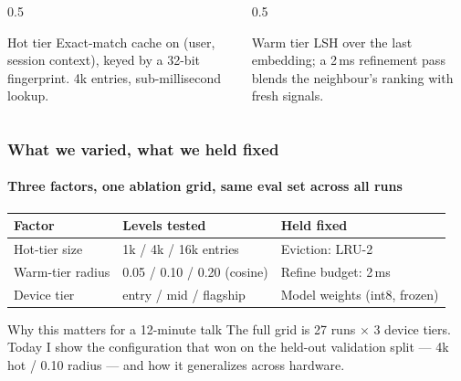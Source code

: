 \begin{frame}
\begin{center}
  \end{center}
  \vspace{1mm}
  \small
  \begin{columns}[T]
    \begin{column}{0.5\textwidth}
      \begin{block}{Hot tier}
        Exact-match cache on (user, session context), keyed by a 32-bit fingerprint. 4k entries, sub-millisecond lookup.
      \end{block}
    \end{column}
    \begin{column}{0.5\textwidth}
      \begin{block}{Warm tier}
        LSH over the last embedding; a 2\,ms refinement pass blends the neighbour's ranking with fresh signals.
      \end{block}
    \end{column}
  \end{columns}
\end{frame}

\begin{frame}
  \frametitle{What we varied, what we held fixed}
  \framesubtitle{Three factors, one ablation grid, same eval set across all runs}
  \begin{table}
    \centering
    \small
    \begin{tabular}{@{}lll@{}}
      \toprule
      \textbf{Factor} & \textbf{Levels tested} & \textbf{Held fixed} \\
      \midrule
      Hot-tier size & 1k / 4k / 16k entries & Eviction: LRU-2 \\
      Warm-tier radius & 0.05 / 0.10 / 0.20 (cosine) & Refine budget: 2\,ms \\
      Device tier & entry / mid / flagship & Model weights (int8, frozen) \\
      \bottomrule
    \end{tabular}
  \end{table}
  \vspace{3mm}
  \begin{alertblock}{Why this matters for a 12-minute talk}
    The full grid is 27 runs $\times$ 3 device tiers. Today I show the configuration that won on the held-out validation split --- 4k hot / 0.10 radius --- and how it generalizes across hardware.
  \end{alertblock}
\end{frame}
